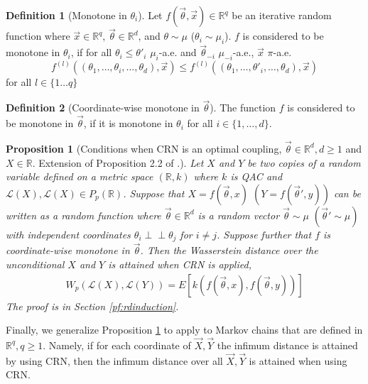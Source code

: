 \documentclass[12pt]{article}
\theoremstyle{plain}%
\newtheorem{prop}[theorem]{Proposition}
\theoremstyle{definition}
\newtheorem{definition}{Definition}[section]
\def\vecx{\vec{X}}
\newcommand{\indep}{\perp \!\!\! \perp}
\begin{document}
\begin{definition}[Monotone in $\theta_i$]\label{def:monovecthetai}
	Let $f(\vec{\theta},\vec{x})\in \mathbb{R}^q$ be an iterative random function where $\vec{x}\in \mathbb{R}^q$, $\vec{\theta}\in \mathbb{R}^d$, and $\theta\sim \mu$ ($\theta_i\sim \mu_i$). $f$ is considered to be monotone in $\theta_i$, if for all $\theta_{i}\leq \theta'_{i}$ $\mu_i$-a.e. and $\vec{\theta}_{-i}$ $\mu_{-i}$-a.e.,  $\vec{x}$ $\pi$-a.e.
	\begin{equation}
		f^{(l)}((\theta_1,\ldots,\theta_{i},\ldots, \theta_d),\vec{x})\leq f^{(l)}((\theta_1,\ldots,\theta'_{i},\ldots, \theta_d),\vec{x})
	\end{equation} 
	for all $l\in \{1\ldots q\}$
\end{definition}	

\begin{definition}[Coordinate-wise monotone in $\vec{\theta}$]\label{def:monovectheta}
The function $f$ is considered to be monotone in $\vec{\theta}$, if it is monotone in  $\theta_i$ for all $i\in\{1,\ldots,d\}$.
\end{definition}	

\begin{prop}[Conditions when CRN is an optimal coupling, $\vec{\theta} \in \mathbb{R}^d, d\geq 1$ and $X\in\mathbb{R}$. Extension of Proposition 2.2 of \cite{crn}.]\label{prop:rd}
	Let $X$ and $Y$ be two copies of a random variable defined on a metric space $(\mathbb{R},k)$ where $k$ is QAC and $\mathcal{L}(X),\mathcal{L}(X)\in P_p(\mathbb{R})$. Suppose that $X=f(\vec{\theta},x)$ $(Y=f(\vec{\theta}',y))$ can be written as a random function where $\vec{\theta}\in \mathbb{R}^d$ is a random vector $\vec{\theta}\sim \mu$ $(\vec{\theta}'\sim \mu)$ with independent coordinates $\theta_i\indep\theta_j$ for $i\neq j$. 
	Suppose further that $f$ is coordinate-wise monotone in $\vec{\theta}$.
	Then the Wasserstein distance over the unconditional $X$ and $Y$ is attained when CRN is applied,
	\begin{align}\label{eq:rdconc}
		W_p(\mathcal{L}(X), \mathcal{L}(Y))=
		E[k(f(\vec{\theta},x),f(\vec{\theta},y))]
	\end{align}
	The proof is in Section \ref{pf:rdinduction}.
\end{prop}


Finally, we generalize Proposition \ref{prop:rd} to apply to Markov chains that are defined in $\mathbb{R}^q, q\geq 1$. Namely, if for each coordinate of $\vecx, \vec{Y}$ the infimum distance is attained by using CRN, then the infimum distance over all $\vecx, \vec{Y}$ is attained when using CRN.
\end{document}
